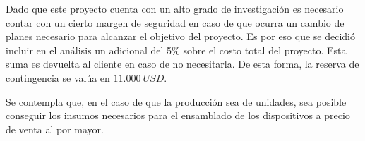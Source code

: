 Dado que este proyecto cuenta con un alto grado de investigación es necesario contar con un cierto margen de seguridad en caso de que ocurra un cambio de planes necesario para alcanzar el objetivo del proyecto. Es por eso que se decidió incluir en el análisis un adicional del 5\% sobre el costo total del proyecto. Esta suma es devuelta al cliente en caso de no necesitarla. De esta forma, la reserva de contingencia se valúa en $11.000 \ USD$.

Se contempla que, en el caso de que la producción sea de \unidadespostfin unidades, sea posible conseguir los insumos necesarios para el ensamblado de los dispositivos a precio de venta al por mayor.
